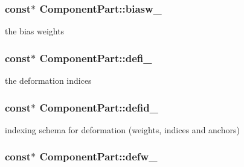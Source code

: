 \subsubsection[{biasw\+\_\+}]{ const$\ast$ Component\+Part\+::biasw\+\_\+\hspace{0.3cm}{\ttfamily [private]}}\label{classComponentPart_a361de825869afbad383a5b4ba1fbca31}


the bias weights 

\hypertarget{classComponentPart_a814b56fc405db36e4b3a7dd1ffa89f7b}{}
\subsubsection[{defi\+\_\+}]{ const$\ast$ Component\+Part\+::defi\+\_\+\hspace{0.3cm}{\ttfamily [private]}}\label{classComponentPart_a814b56fc405db36e4b3a7dd1ffa89f7b}


the deformation indices 

\hypertarget{classComponentPart_ab408f9bd78053f571402b933b56a355c}{}
\subsubsection[{defid\+\_\+}]{ const$\ast$ Component\+Part\+::defid\+\_\+\hspace{0.3cm}{\ttfamily [private]}}\label{classComponentPart_ab408f9bd78053f571402b933b56a355c}


indexing schema for deformation (weights, indices and anchors) 

\hypertarget{classComponentPart_a4841935dcac81d3e9c97c95722a44ef8}{}
\subsubsection[{defw\+\_\+}]{ const$\ast$ Component\+Part\+::defw\+\_\+\hspace{0.3cm}{\ttfamily [private]}}\label{classComponentPart_a4841935dcac81d3e9c97c95722a44ef8}


